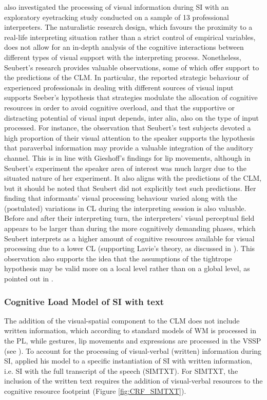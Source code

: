 \citet{seubert_visuelle_2019} also investigated the processing of visual information during SI with an exploratory eyetracking study conducted on a sample of 13 professional interpreters. The naturalistic research design, which favours the proximity to a real-life interpreting situation rather than a strict control of empirical variables, does not allow for an in-depth analysis of the cognitive interactions between different types of visual support with the interpreting process. Nonetheless, Seubert's research provides valuable observations, some of which offer support to the predictions of the CLM. In particular, the reported strategic behaviour of experienced professionals in dealing with different sources of visual input supports Seeber's hypothesis that strategies modulate the allocation of cognitive resources in order to avoid cognitive overload, and that the supportive or distracting potential of visual input depends, inter alia, also on the type of input processed. For instance, the observation that Seubert's test subjects devoted a high proportion of their visual attention to the speaker supports the hypothesis that paraverbal information may provide a valuable integration of the auditory channel. This is in line with Gieshoff's findings for lip movements, although in Seubert's experiment the speaker area of interest was much larger due to the situated nature of her experiment. It also aligns with the predictions of the CLM, but it should be noted that Seubert did not explicitly test such predictions. Her finding that informants' visual processing behaviour varied along with the (postulated) variations in CL during the interpreting session is also valuable. Before and after their interpreting turn, the interpreters' visual perceptual field appears to be larger than during the more cognitively demanding phases, which Seubert interprets as a higher amount of cognitive resources available for visual processing due to a lower CL (supporting Lavie's theory, as discussed in ). This observation also supports the idea that the assumptions of the tightrope hypothesis \citep{gile_testing_1999} may be valid more on a local level rather than on a global level, as pointed out in \citet{seeber_cognitive_2012}.

\subsubsection{Cognitive Load Model of SI with text} \label{CLM_with text}
The addition of the visual-spatial component to the CLM does not include written information, which according to standard models of WM is processed in the PL, while gestures, lip movements and expressions are processed in the VSSP (see ). To account for the processing of visual-verbal (written) information during SI, \citet{seeber_multimodal_2017} applied his model to a specific instantiation of SI with written information, i.e. SI with the full transcript of the speech (SIMTXT). For SIMTXT, the inclusion of the written text requires the addition of visual-verbal resources to the cognitive resource footprint (Figure \ref{fig:CRF_SIMTXT}).

